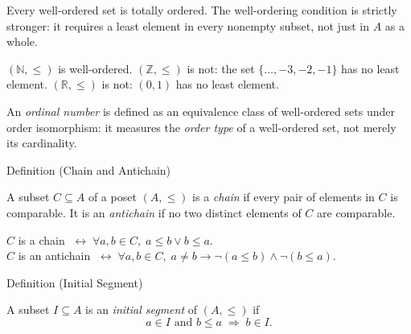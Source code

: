 \begin{remark*}
Every well-ordered set is totally ordered. The well-ordering condition is
strictly stronger: it requires a least element in every nonempty subset,
not just in $A$ as a whole.
\end{remark*}

\begin{example*}
$(\mathbb{N},\leq)$ is well-ordered. $(\mathbb{Z},\leq)$ is not: the set
$\{\dots,-3,-2,-1\}$ has no least element. $(\mathbb{R},\leq)$ is not:
$(0,1)$ has no least element.
\end{example*}

\begin{remark*}
An \emph{ordinal number} is defined as an equivalence class of well-ordered
sets under order isomorphism: it measures the \emph{order type} of a
well-ordered set, not merely its cardinality.
\end{remark*}

\begin{definitionbox}{Definition (Chain and Antichain)}
\begin{definition}\label{def:chain}
A subset $C \subseteq A$ of a poset $(A,\leq)$ is a \emph{chain} if every
pair of elements in $C$ is comparable. It is an \emph{antichain} if no two
distinct elements of $C$ are comparable.
\end{definition}
\end{definitionbox}

\NoLocalDependencies

\begin{remark*}
$C$ is a chain $\;\leftrightarrow\; \forall a,b \in C,\; a \leq b \vee b \leq a$.\\
$C$ is an antichain $\;\leftrightarrow\; \forall a,b \in C,\; a \neq b \to \neg(a \leq b) \wedge \neg(b \leq a)$.
\end{remark*}

\begin{definitionbox}{Definition (Initial Segment)}
\begin{definition}\label{def:initial-segment}
A subset $I \subseteq A$ is an \emph{initial segment} of $(A,\leq)$ if
\[
a \in I \text{ and } b \leq a \;\Rightarrow\; b \in I.
\]
\end{definition}
\end{definitionbox}

